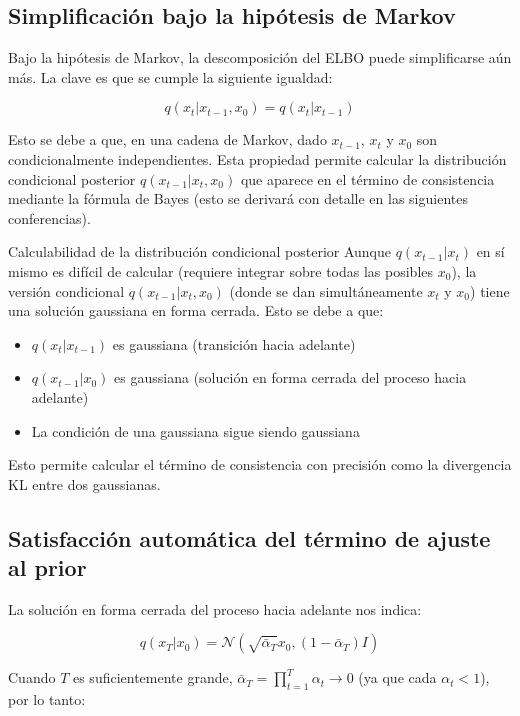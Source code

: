 \subsection{Simplificación bajo la hipótesis de Markov}

Bajo la hipótesis de Markov, la descomposición del ELBO puede simplificarse aún más. La clave es que se cumple la siguiente igualdad:

$$q(x_t | x_{t-1}, x_0) = q(x_t | x_{t-1})$$

Esto se debe a que, en una cadena de Markov, dado $x_{t-1}$, $x_t$ y $x_0$ son condicionalmente independientes. Esta propiedad permite calcular la distribución condicional posterior $q(x_{t-1}|x_t, x_0)$ que aparece en el término de consistencia mediante la fórmula de Bayes (esto se derivará con detalle en las siguientes conferencias).

\begin{knowledgebox}{Calculabilidad de la distribución condicional posterior}
Aunque $q(x_{t-1}|x_t)$ en sí mismo es difícil de calcular (requiere integrar sobre todas las posibles $x_0$), la versión condicional $q(x_{t-1}|x_t, x_0)$ (donde se dan simultáneamente $x_t$ y $x_0$) tiene una solución gaussiana en forma cerrada. Esto se debe a que:
\begin{itemize}
    \item $q(x_t|x_{t-1})$ es gaussiana (transición hacia adelante)
    \item $q(x_{t-1}|x_0)$ es gaussiana (solución en forma cerrada del proceso hacia adelante)
    \item La condición de una gaussiana sigue siendo gaussiana
\end{itemize}
Esto permite calcular el término de consistencia con precisión como la divergencia KL entre dos gaussianas.
\end{knowledgebox}

\subsection{Satisfacción automática del término de ajuste al prior}

La solución en forma cerrada del proceso hacia adelante nos indica:

$$q(x_T | x_0) = \mathcal{N}(\sqrt{\bar{\alpha}_T} x_0, (1-\bar{\alpha}_T) I)$$

Cuando $T$ es suficientemente grande, $\bar{\alpha}_T = \prod_{t=1}^T \alpha_t \to 0$ (ya que cada $\alpha_t < 1$), por lo tanto:

